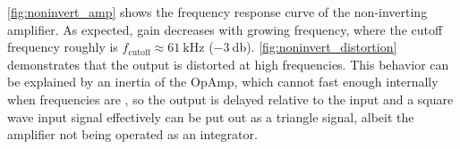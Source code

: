 \autoref{fig:noninvert_amp} shows the frequency response curve of the non-inverting amplifier.
As expected, gain decreases with growing frequency, where the cutoff frequency roughly is $f_\text{cutoff}\approx\SI{61}{\kilo\hertz}$ ($\SI{-3}{\decibel}$).
\autoref{fig:noninvert_distortion} demonstrates that the output is distorted at high frequencies.
This behavior can be explained by an inertia of the OpAmp, which cannot  fast enough internally when frequencies are , so the output is delayed relative to the input and a square wave input signal effectively can be put out as a triangle signal, albeit the amplifier not being operated as an integrator.
